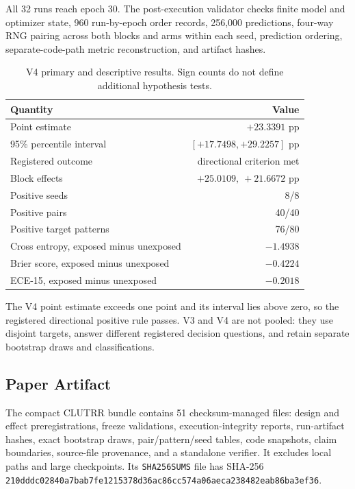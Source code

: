All 32 runs reach epoch 30.  The post-execution validator checks finite model
and optimizer state, 960 run-by-epoch order records, 256,000 predictions,
four-way RNG pairing across both blocks and arms within each seed, prediction
ordering, separate-code-path metric reconstruction, and artifact hashes.

\begin{table}[H]
\caption{V4 primary and descriptive results.  Sign counts do not define
additional hypothesis tests.}
\label{tab:app-clutrr-v4}
\centering
\small
\begin{tabular}{lr}
\toprule
Quantity & Value \\
\midrule
Point estimate & $+23.3391$ pp \\
95\% percentile interval & $[+17.7498,+29.2257]$ pp \\
Registered outcome & directional criterion met \\
Block effects & $+25.0109,\ +21.6672$ pp \\
Positive seeds & 8/8 \\
Positive pairs & 40/40 \\
Positive target patterns & 76/80 \\
Cross entropy, exposed minus unexposed & $-1.4938$ \\
Brier score, exposed minus unexposed & $-0.4224$ \\
ECE-15, exposed minus unexposed & $-0.2018$ \\
\bottomrule
\end{tabular}
\end{table}

The V4 point estimate exceeds one point and its interval lies above zero, so
the registered directional positive rule passes.  V3 and V4 are not pooled:
they use disjoint targets, answer different registered decision questions,
and retain separate bootstrap draws and classifications.

\subsection{Paper Artifact}

The compact CLUTRR bundle contains 51 checksum-managed files:
design and effect preregistrations, freeze validations, execution-integrity
reports, run-artifact hashes, exact bootstrap draws, pair/pattern/seed tables,
code snapshots, claim boundaries, source-file provenance, and a standalone
verifier.  It excludes local paths and large checkpoints.  Its
\texttt{SHA256SUMS} file has SHA-256
\texttt{210dddc02840a7bab7fe1215378d36ac\allowbreak86cc574a06aeca238482eab86ba3ef36}.
